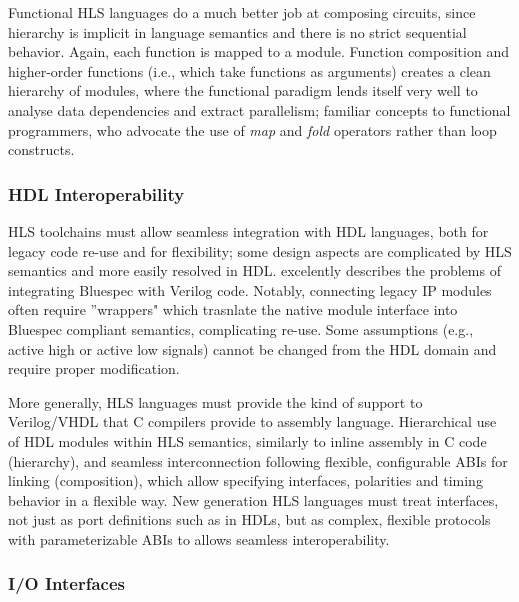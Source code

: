 \par Functional HLS languages do a much better job at composing circuits, since hierarchy is implicit in language semantics and there is no strict sequential behavior. Again, each function is mapped to a module. Function composition and higher-order functions (i.e., which take functions as arguments) creates a clean hierarchy of modules, where the functional paradigm lends itself very well to analyse data dependencies and extract parallelism; familiar concepts to functional programmers, who advocate the use of \textit{map} and \textit{fold} operators rather than loop constructs.  


\subsubsection{HDL Interoperability}

HLS toolchains must allow seamless integration with HDL languages, both for legacy code re-use and for flexibility; some design aspects are complicated by HLS semantics and more easily resolved in HDL. \cite{bluespec_bad} excelently describes the problems of integrating Bluespec with Verilog code. Notably, connecting legacy IP modules often require ''wrappers" which trasnlate the native module interface into Bluespec compliant semantics, complicating re-use. Some assumptions (e.g., active high or active low signals) cannot be changed from the HDL domain and require proper modification.
\par More generally, HLS languages must provide the kind of support to Verilog/VHDL that C compilers provide to assembly language. Hierarchical use of HDL modules within HLS semantics, similarly to inline assembly in C code (hierarchy), and seamless interconnection following flexible, configurable ABIs for linking (composition), which allow specifying interfaces, polarities and timing behavior in a flexible way. New generation HLS languages must treat interfaces, not just as port definitions such as in HDLs, but as complex, flexible protocols with parameterizable ABIs to allows seamless interoperability.

\subsubsection{I/O Interfaces}

